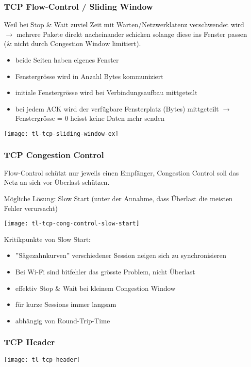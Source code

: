\subsubsection{TCP Flow-Control / Sliding Window}

Weil bei Stop \& Wait zuviel Zeit mit Warten/Netzwerklatenz verschwendet wird
$\rightarrow$ mehrere Pakete direkt nacheinander schicken solange diese ins
Fenster passen (\& nicht durch Congestion Window limitiert).

\begin{itemize}
	\item beide Seiten haben eigenes Fenster
	\item Fenstergrösse wird in Anzahl Bytes kommuniziert
	\item initiale Fenstergrösse wird bei Verbindungsaufbau mittgeteilt
	\item bei jedem ACK wird der verfügbare Fensterplatz (Bytes) mittgeteilt
	      $\rightarrow$ Fenstergrösse = 0 heisst keine Daten mehr senden
\end{itemize}

\begin{center}
	\texttt{[image: tl-tcp-sliding-window-ex]}
\end{center}


\subsubsection{TCP Congestion Control}

Flow-Control schützt nur jeweils einen Empfänger, Congestion Control soll das Netz
an sich vor Überlast schützen.

Mögliche Lösung: Slow Start (unter der Annahme, dass Überlast die meisten Fehler
verursacht)

\begin{center}
	\texttt{[image: tl-tcp-cong-control-slow-start]}
\end{center}


Kritikpunkte von Slow Start:
\begin{itemize}
    \item ''Sägezahnkurven'' verschiedener Session neigen sich zu synchronisieren
    \item Bei Wi-Fi sind bitfehler das grösste Problem, nicht Überlast
    \item effektiv Stop \& Wait bei kleinem Congestion Window
    \item für kurze Sessions immer langsam
    \item abhängig von Round-Trip-Time
\end{itemize}


\subsubsection{TCP Header}

\begin{center}
	\texttt{[image: tl-tcp-header]}
\end{center}


